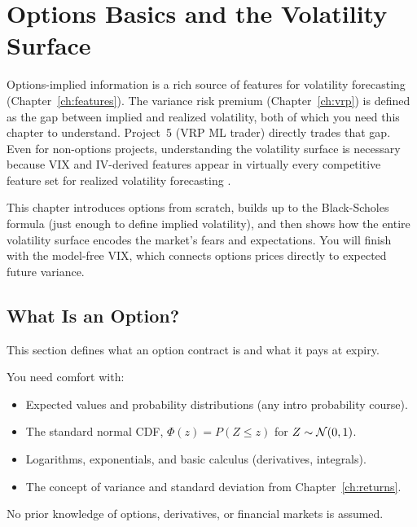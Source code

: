 \chapter{Options Basics and the Volatility Surface}
\label{ch:volsurface}

\begin{application}
Options-implied information is a rich source of features for volatility forecasting (Chapter~\ref{ch:features}).
The variance risk premium (Chapter~\ref{ch:vrp}) is defined as the gap between implied and realized volatility, both of which you need this chapter to understand.
Project~5 (VRP ML trader) directly trades that gap.
Even for non-options projects, understanding the volatility surface is necessary because VIX and IV-derived features appear in virtually every competitive feature set for realized volatility forecasting \citep{Gu2020}.
\end{application}

This chapter introduces options from scratch, builds up to the Black-Scholes formula (just enough to define implied volatility), and then shows how the entire volatility surface encodes the market's fears and expectations.
You will finish with the model-free VIX, which connects options prices directly to expected future variance.

\section{What Is an Option?}
\label{sec:what-is-option}

This section defines what an option contract is and what it pays at expiry.

\begin{prereq}
You need comfort with:
\begin{itemize}[nosep]
  \item Expected values and probability distributions (any intro probability course).
  \item The standard normal CDF, $\Phi(z) = P(Z \leq z)$ for $Z \sim \mathcal{N}(0,1)$.
  \item Logarithms, exponentials, and basic calculus (derivatives, integrals).
  \item The concept of variance and standard deviation from Chapter~\ref{ch:returns}.
\end{itemize}
No prior knowledge of options, derivatives, or financial markets is assumed.
\end{prereq}


